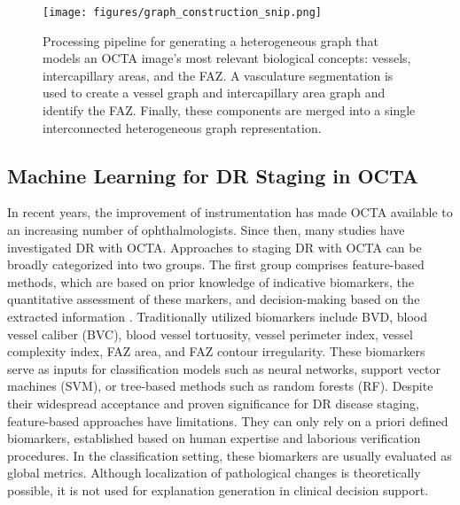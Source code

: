 \begin{figure*}[!ht]
    \centering
    \texttt{[image: figures/graph\_construction\_snip.png]}
    \caption{Processing pipeline for generating a heterogeneous graph that models an OCTA image's most relevant biological concepts: vessels, intercapillary areas, and the FAZ. A vasculature segmentation \cite{kreitner2023detailed} is used to create a vessel graph and intercapillary area graph and identify the FAZ. Finally, these components are merged into a single interconnected heterogeneous graph representation.}
        \vspace{-0.3cm}
    \label{fig:construction}
\end{figure*}


\subsection{Machine Learning for DR Staging in OCTA} 
In recent years, the improvement of instrumentation \cite{kim2011vivo}  has made OCTA available to an increasing number of ophthalmologists. Since then, many studies have investigated DR with OCTA. Approaches to staging DR with OCTA can be broadly categorized into two groups. 
The first group comprises feature-based methods, which are based on prior knowledge of indicative biomarkers, the quantitative assessment of these markers, and decision-making based on the extracted information \cite{le2021machine, alam2019supervised, sandhu2020automated, alam2020quantitative}. Traditionally utilized biomarkers include BVD, blood vessel caliber (BVC), blood vessel tortuosity, vessel perimeter index, vessel complexity index, FAZ area, and FAZ contour irregularity. These biomarkers serve as inputs for classification models such as neural networks, support vector machines (SVM), or tree-based methods such as random forests (RF). Despite their widespread acceptance and proven significance for DR disease staging, feature-based approaches have limitations. They can only rely on a priori defined biomarkers, established based on human expertise and laborious verification procedures. In the classification setting, these biomarkers are usually evaluated as global metrics. Although localization of pathological changes is theoretically possible, it is not used for explanation generation in clinical decision support. 


